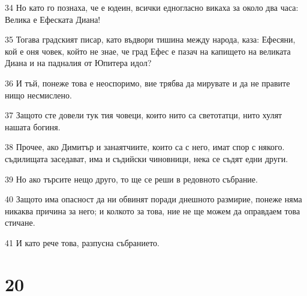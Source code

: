 \par 34 Но като го познаха, че е юдеин, всички едногласно викаха за около два часа: Велика е Ефеската Диана!
\par 35 Тогава градският писар, като въдвори тишина между народа, каза: Ефесяни, кой е оня човек, който не знае, че град Ефес е пазач на капището на великата Диана и на падналия от Юпитера идол?
\par 36 И тъй, понеже това е неоспоримо, вие трябва да мирувате и да не правите нищо несмислено.
\par 37 Защото сте довели тук тия човеци, които нито са светотатци, нито хулят нашата богиня.
\par 38 Прочее, ако Димитър и занаятчиите, които са с него, имат спор с някого. съдилищата заседават, има и съдийски чиновници, нека се съдят едни други.
\par 39 Но ако търсите нещо друго, то ще се реши в редовното събрание.
\par 40 Защото има опасност да ни обвинят поради днешното размирие, понеже няма никаква причина за него; и колкото за това, ние не ще можем да оправдаем това стичане.
\par 41 И като рече това, разпусна събранието.

\chapter{20}

